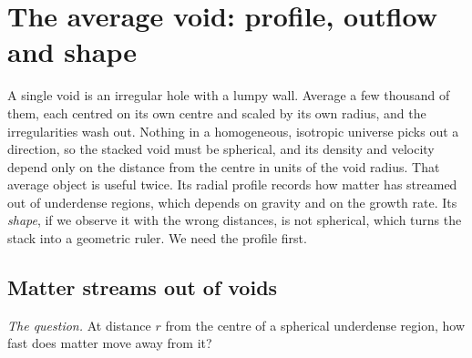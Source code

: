 \section{The average void: profile, outflow and shape}
\label{11b:sec:void-profiles}

A single void is an irregular hole with a lumpy wall. Average a few thousand of
them, each centred on its own centre and scaled by its own radius, and the
irregularities wash out. Nothing in a homogeneous, isotropic universe picks out a
direction, so the stacked void must be spherical, and its density and velocity
depend only on the distance from the centre in units of the void radius. That
average object is useful twice. Its radial profile records how matter has
streamed out of underdense regions, which depends on gravity and on the growth
rate. Its \emph{shape}, if we observe it with the wrong distances, is not
spherical, which turns the stack into a geometric ruler. We need the profile
first.

\subsection{Matter streams out of voids}
\label{11b:sec:void-velocity}

\emph{The question.} At distance $r$ from the centre of a spherical underdense
region, how fast does matter move away from it?

